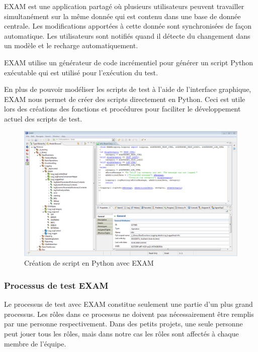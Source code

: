 EXAM est une application partagé où plusieurs utilisateurs peuvent travailler simultanément sur la même donnée qui est contenu dans une base de donnée centrale. Les modifications apportées à cette donnée sont synchronisées de façon automatique. Les utilisateurs sont notifiés quand il détecte du changement dans un modèle et le recharge automatiquement.

EXAM utilise un générateur de code incrémentiel pour générer un script Python exécutable qui est utilisé pour l'exécution du test.

En plus de pouvoir modéliser les scripts de test à l'aide de l'interface graphique, EXAM nous permet de créer des scripts directement en Python. Ceci est utile lors des créations des fonctions et procédures pour faciliter le développement actuel des scripts de test.

\begin{figure}[H]
 \centering
 \includegraphics[scale=0.4]{images/exam_python}
 \caption{Création de script en Python avec EXAM}
\end{figure}

\subsubsection{Processus de test EXAM}

Le processus de test avec EXAM constitue seulement une partie d'un plus grand processus. Les rôles dans ce processus ne doivent pas nécessairement être remplis par une personne respectivement. Dans des petits projets, une seule personne peut jouer tous les rôles, mais dans notre cas les rôles sont affectés à chaque membre de l'équipe.

